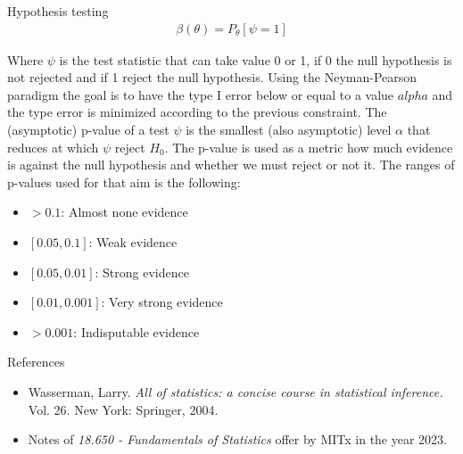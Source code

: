 \documentclass{beamer}
\begin{document}
\begin{frame}
\begin{columns}
\begin{column}{0.3\textwidth}
\begin{block}{Hypothesis testing}
\begin{align*}
    \beta(\theta) = P_\theta[\psi = 1]
\end{align*}

Where $\psi$ is the test statistic that can take value 0 or 1, if 0 the null hypothesis is not rejected and if 1 reject the null hypothesis. Using the Neyman-Pearson paradigm the goal is to have the type I error below or equal to a value $alpha$ and the type error is minimized according to the previous constraint. The (asymptotic) p-value of a test $\psi$ is the smallest (also asymptotic) level $\alpha$ that reduces at which $\psi$ reject $H_0$. The p-value is used as a metric how much evidence is against the null hypothesis and whether we must reject or not it. The ranges of p-values used for that aim is the following:

\begin{itemize}
    \item $>0.1$: Almost none evidence
    \item $[0.05, 0.1]$: Weak evidence
    \item $[0.05, 0.01]$: Strong evidence
    \item $[0.01, 0.001]$: Very strong evidence
    \item $>0.001$: Indisputable evidence
\end{itemize}

\end{block} 

\begin{block}{References}
    \begin{itemize}
        \item Wasserman, Larry. \textit{All of statistics: a concise course in statistical inference.} Vol. 26. New York: Springer, 2004.
        \item Notes of \textit{18.650 - Fundamentals of Statistics} offer by MITx in the year 2023.
    \end{itemize}
\end{block}

\end{column}

\end{columns}

\end{frame}
\end{document}
